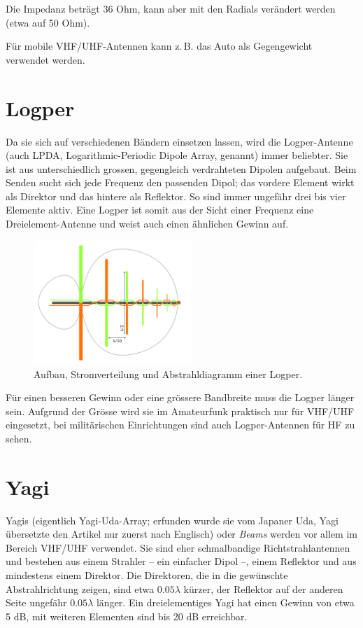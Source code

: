 Die Impedanz beträgt 36 Ohm, kann aber mit den Radials verändert werden (etwa auf 50 Ohm).

Für mobile VHF/UHF-Antennen kann z.\,B. das Auto als Gegengewicht verwendet werden.

\section{Logper}
Da sie sich auf verschiedenen Bändern einsetzen lassen, wird die Logper-Antenne (auch LPDA, Logarithmic-Periodic Dipole Array, genannt) immer beliebter. Sie ist aus unterschiedlich grossen, gegengleich verdrahteten Dipolen aufgebaut. Beim Senden sucht sich jede Frequenz den passenden Dipol; das vordere Element wirkt als Direktor und das hintere als Reflektor. So sind immer ungefähr drei bis vier Elemente aktiv. Eine Logper ist somit aus der Sicht einer Frequenz eine Dreielement-Antenne und weist auch einen ähnlichen Gewinn auf.

\begin{figure}[h!]
 \centering
 \includegraphics[width=6cm]{./png/Amfu-Logper.png}
 \caption{Aufbau, Stromverteilung und Abstrahldiagramm einer Logper.}
 \label{fig:logper}
\end{figure}

Für einen besseren Gewinn oder eine grössere Bandbreite muss die Logper länger sein. Aufgrund der Grösse wird sie im Amateurfunk praktisch nur für VHF/UHF eingesetzt, bei militärischen Einrichtungen sind auch Logper-Antennen für HF zu sehen.

\section{Yagi}
Yagis (eigentlich Yagi-Uda-Array; erfunden wurde sie vom Japaner Uda, Yagi übersetzte den Artikel nur zuerst nach Englisch) oder \textit{Beams} werden vor allem im Bereich VHF/UHF verwendet. Sie sind eher schmalbandige Richtstrahlantennen und bestehen aus einem Strahler – ein einfacher Dipol –, einem Reflektor und aus mindestens einem Direktor. Die Direktoren, die in die gewünschte Abstrahlrichtung zeigen, sind etwa $0.05 \lambda$ kürzer, der Reflektor auf der anderen Seite ungefähr $0.05 \lambda$ länger. Ein dreielementiges Yagi hat einen Gewinn von etwa 5 dB, mit weiteren Elementen sind bis 20 dB erreichbar.

